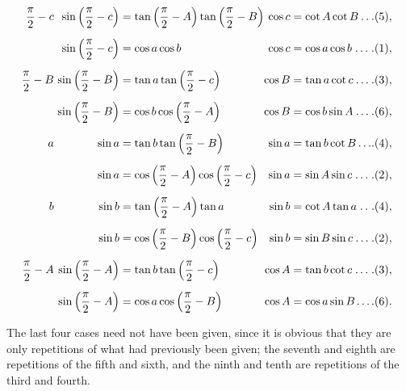 \documentclass{book}[2004/02/16]
\begin{document}
\begin{mainmatter}
\begin{spacing}{1.3}
\[
\begin{array}{@{}r@{\ } r@{\;}l@{ } r@{\;}l@{.}r}
   \dfrac{\pi}{2}-c
&  \sin\left(\dfrac{\pi}{2}-c\right)
&= \tan\left(\dfrac{\pi}{2}-A\right)
   \tan\left(\dfrac{\pi}{2}-B\right)
& \cos c &= \cot A \cot B \dotfill & (5),
\\[3ex]
&  \sin\left(\dfrac{\pi}{2}-c\right)
&= \cos a \cos b
&  \cos c &= \cos a \cos b \dotfill & (1),
\\[3ex]
   \dfrac{\pi}{2}-B
&         \sin\left(\dfrac{\pi}{2}-B\right)
&= \tan a \tan\left(\dfrac{\pi}{2}-c\right)
&  \cos B &= \tan a \cot c \dotfill & (3),
\\[3ex]
&         \sin\left(\dfrac{\pi}{2}-B\right)
&= \cos b \cos\left(\dfrac{\pi}{2}-A\right)
& \cos B &= \cos b \sin A \dotfill & (6),
\\[3ex]
a& \sin a
&= \tan b \tan \left(\dfrac{\pi}{2}-B\right)
&  \sin a &= \tan b \cot B \ldots\dotfill & (4),
\\[3ex]
&  \sin a
&= \cos\left(\dfrac{\pi}{2}-A\right)
   \cos\left(\dfrac{\pi}{2}-c\right)
&  \sin a &= \sin A \sin c \dotfill & (2),
\\[3ex]
b& \sin b
&= \tan\left(\dfrac{\pi}{2}-A\right) \tan a
&  \sin b &= \cot A\tan a \dotfill & (4),
\\[3ex]
&  \sin b
&= \cos\left(\dfrac{\pi}{2}-B\right)
   \cos\left(\dfrac{\pi}{2}-c\right)
&  \sin b &=\sin B \sin c \dotfill & (2),
\\[3ex]
   \dfrac{\pi}{2}-A
&        \sin\left(\dfrac{\pi}{2}-A\right)
&= \tan b \tan\left(\dfrac{\pi}{2}-c\right)
& \cos A &= \tan b\cot c \dotfill & (3),
\\[3ex]
&        \sin\left(\dfrac{\pi}{2}-A\right)
&= \cos a \cos\left(\dfrac{\pi}{2}-B\right)
& \cos A &= \cos a \sin B \dotfill & (6).
\end{array}
\]

The last four cases need not have been given, since it is obvious
that they are only repetitions of what had previously been given;
the seventh and eighth are repetitions of the fifth and sixth, and
the ninth and tenth are repetitions of the third and fourth.


\end{spacing}
\end{mainmatter}
\end{document}
